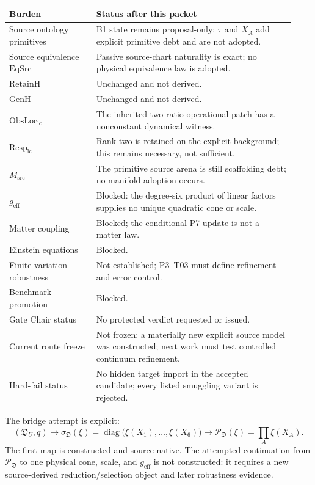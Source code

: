 \documentclass[11pt]{article}
\newcommand{\D}{\mathfrak D}
\begin{document}
\begin{center}
\small
\begin{tabular}{p{0.29\linewidth}p{0.64\linewidth}}
\toprule
Burden & Status after this packet \\
\midrule
Source ontology primitives & B1 state remains proposal-only; $\tau$ and $X_A$ add explicit primitive debt and are not adopted. \\
Source equivalence $\mathrm{EqSrc}$ & Passive source-chart naturality is exact; no physical equivalence law is adopted. \\
$\mathrm{RetainH}$ & Unchanged and not derived. \\
$\mathrm{GenH}$ & Unchanged and not derived. \\
$\mathrm{ObsLoc}_{\mathrm{lc}}$ & The inherited two-ratio operational patch has a nonconstant dynamical witness. \\
$\mathrm{Resp}_{\mathrm{lc}}$ & Rank two is retained on the explicit background; this remains necessary, not sufficient. \\
$M_{\mathrm{src}}$ & The primitive source arena is still scaffolding debt; no manifold adoption occurs. \\
$g_{\mathrm{eff}}$ & Blocked: the degree-six product of linear factors supplies no unique quadratic cone or scale. \\
Matter coupling & Blocked; the conditional P7 update is not a matter law. \\
Einstein equations & Blocked. \\
Finite-variation robustness & Not established; P3--T03 must define refinement and error control. \\
Benchmark promotion & Blocked. \\
Gate Chair status & No protected verdict requested or issued. \\
Current route freeze & Not frozen: a materially new explicit source model was constructed; next work must test controlled continuum refinement. \\
Hard-fail status & No hidden target import in the accepted candidate; every listed smuggling variant is rejected. \\
\bottomrule
\end{tabular}
\end{center}

The bridge attempt is explicit:
\begin{equation}
  (\D_U,q)\longmapsto
  \sigma_{\D}(\xi)=\operatorname{diag}
  \bigl(\xi(X_1),\ldots,\xi(X_6)\bigr)
  \longmapsto
  \mathcal P_{\D}(\xi)=\prod_A\xi(X_A).
\end{equation}
The first map is constructed and source-native.  The attempted continuation
from $\mathcal P_{\D}$ to one physical cone, scale, and
$g_{\mathrm{eff}}$ is not constructed: it requires a new source-derived
reduction/selection object and later robustness evidence.
\end{document}
